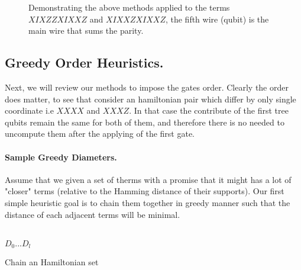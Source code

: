 \documentclass{article}
\begin{document}
\begin{figure*}[h]
    
    \caption{ Demonstrating the above methods applied to the terms \( XIXZZXIXXZ \) and \( XIXXZXIXXZ \), the fifth wire (qubit) is the main wire that sums the parity.}
    \label{fig:average-data-vs-model}
\end{figure*}
\begin{multicols}{2}

\section{Greedy Order Heuristics.}
Next, we will review our methods to impose the gates order. Clearly the order does matter, to see that consider an hamiltonian pair which differ by only single coordinate i.e \(XXXX\) and \(XXXZ\). In that case the contribute of the first tree qubits remain the same for both of them, and therefore there is no needed to uncompute them after the applying of the first gate.      
\paragraph{Sample Greedy Diameters.} Assume that we given a set of therms with a promise that it might has a lot of "closer" terms (relative to the Hamming distance of their supports). Our first simple heuristic goal is to chain them together in greedy manner such that the distance of each adjacent terms will be minimal. 
\end{multicols}
\begin{algorithm*}[h]
\ \\ 
\Return \(D_{0} ... D_{l}\) 
 \caption{Chain an Hamiltonian set }
\end{algorithm*}
\end{document}
